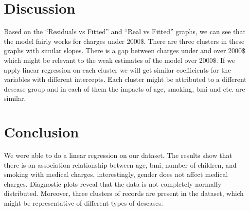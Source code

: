 \documentclass[
]{article}
\begin{document}
\hypertarget{discussion}{%
\section{Discussion}\label{discussion}}

Based on the ``Residuals vs Fitted'' and ``Real vs Fitted'' graphs, we can see that the model fairly works for charges under 2000\$. There are three clusters in these graphs with similar slopes. There is a gap between charges under and over 2000\$ which might be relevant to the weak estimates of the model over 2000\$.
If we apply linear regression on each cluster we will get similar coefficients for the variables with different intercepts. Each cluster might be attributed to a different desease group and in each of them the impacts of age, smoking, bmi and etc. are similar.

\hypertarget{conclusion}{%
\section{Conclusion}\label{conclusion}}

We were able to do a linear regression on our dataset. The results show that there is an association relationship between age, bmi, number of children, and smoking with medical charges. interestingly, gender does not affect medical charges. Diagnostic plots reveal that the data is not completely normally distributed. Moreover, three clusters of records are present in the dataset, which might be representative of different types of deseases.
\end{document}
